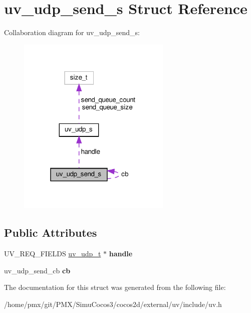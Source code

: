 \hypertarget{structuv__udp__send__s}{}\section{uv\+\_\+udp\+\_\+send\+\_\+s Struct Reference}
\label{structuv__udp__send__s}


Collaboration diagram for uv\+\_\+udp\+\_\+send\+\_\+s\+:
\nopagebreak
\begin{figure}[H]
\begin{center}
\leavevmode
\includegraphics[width=208pt]{structuv__udp__send__s__coll__graph}
\end{center}
\end{figure}
\subsection*{Public Attributes}
\begin{DoxyCompactItemize}
\item 
\mbox{\label{structuv__udp__send__s_af5349a23208f0171bdccf0a953104125}} 
U\+V\+\_\+\+R\+E\+Q\+\_\+\+F\+I\+E\+L\+DS \hyperlink{structuv__udp__s}{uv\+\_\+udp\+\_\+t} $\ast$ {\bfseries handle}
\item 
\mbox{\label{structuv__udp__send__s_afa663458342eea8e93b07251d57e79a2}} 
uv\+\_\+udp\+\_\+send\+\_\+cb {\bfseries cb}
\end{DoxyCompactItemize}


The documentation for this struct was generated from the following file\+:\begin{DoxyCompactItemize}
\item 
/home/pmx/git/\+P\+M\+X/\+Simu\+Cocos3/cocos2d/external/uv/include/uv.\+h\end{DoxyCompactItemize}
